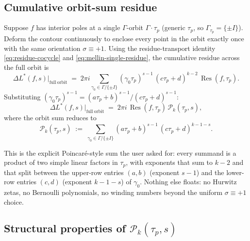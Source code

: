 \documentclass[11pt]{article}
\DeclareMathOperator{\Res}{Res}
\begin{document}
\subsection{Cumulative orbit-sum residue}\label{subsec:mellin-cumulative}

Suppose $f$ has interior poles at a single $\Gamma$-orbit
$\Gamma\cdot\tau_p$ (generic $\tau_p$, so
$\Gamma_{\tau_p} = \{\pm I\}$).  Deform the contour continuously to
enclose every point in the orbit exactly once with the same
orientation $\sigma \equiv +1$.  Using the residue-transport identity
\eqref{eq:residue-cocycle} and \eqref{eq:mellin-single-residue}, the
cumulative residue across the full orbit is
\begin{equation}\label{eq:mellin-cumulative-raw}
  \Delta L^*(f, s)\bigl|_{\mathrm{full\ orbit}}
  \;=\; 2\pi i\!\sum_{\gamma_0 \in \Gamma/\{\pm I\}}\!
  (\gamma_0\tau_p)^{s - 1}\,(c\tau_p + d)^{k - 2}\,\Res(f, \tau_p).
\end{equation}
Substituting $(\gamma_0\tau_p)^{s-1} = (a\tau_p + b)^{s-1}/(c\tau_p + d)^{s-1}$:
\begin{equation}\label{eq:mellin-cumulative-clean}
  \Delta L^*(f, s)\bigl|_{\mathrm{full\ orbit}}
  \;=\; 2\pi i\,\Res(f, \tau_p)\,\mathcal{P}_k(\tau_p, s),
\end{equation}
where the orbit sum reduces to
\begin{equation}\label{eq:Pk-def}
  \mathcal{P}_k(\tau_p, s)
  \;:=\; \sum_{\gamma_0 \in \Gamma/\{\pm I\}}\!
  (a\tau_p + b)^{s - 1}\,(c\tau_p + d)^{k - 1 - s}.
\end{equation}

This is the explicit Poincar\'e-style sum the user asked for: every
summand is a product of two simple linear factors in $\tau_p$, with
exponents that sum to $k - 2$ and that split between the
upper-row entries $(a, b)$ (exponent $s - 1$) and the lower-row
entries $(c, d)$ (exponent $k - 1 - s$) of $\gamma_0$.  Nothing
else floats: no Hurwitz zetas, no Bernoulli polynomials, no winding
numbers beyond the uniform $\sigma \equiv +1$ choice.

\subsection{Structural properties of $\mathcal{P}_k(\tau_p, s)$}\label{subsec:Pk-structure}
\end{document}
